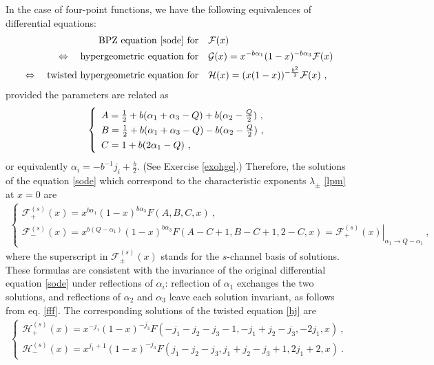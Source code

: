 \documentclass[12pt,a4paper,notitlepage]{report}
\numberwithin{equation}{section}
\theoremstyle{break}
\begin{document}
In the case of four-point functions, we have the following equivalences of differential equations:
\begin{align}
  \text{BPZ equation \eqref{sode} for}\quad  & \mathcal{F}(x)
\\ 
\Leftrightarrow\quad  \text{hypergeometric\ equation\ for\quad }&  \mathcal{G}(x)= x^{-b\alpha_1}(1-x)^{-b\alpha_3}\mathcal{F}(x) 
\\
\Leftrightarrow\quad  \text{twisted\ hypergeometric\ equation\ for\quad }& \mathcal{H}(x)=(x(1-x))^{-\frac{b^2}{2}}\mathcal{F}(x) \ ,
\label{fgs}
\end{align}
provided the parameters are related as
\begin{align}
\renewcommand{\arraystretch}{1.3}
\left\{\begin{array}{l}   A = \frac12 + b(\alpha_1+\alpha_3-Q) + b(\alpha_2-\tfrac{Q}{2}) \ , \\
      B = \frac12 + b(\alpha_1+\alpha_3-Q) - b(\alpha_2-\tfrac{Q}{2}) \ , \\
      C = 1 + b(2\alpha_1-Q) \ ,
\end{array}\right. 
\label{abc}
\end{align}
or equivalently $\alpha_i = -b^{-1}j_i +\frac{b}{2}$.
(See Exercise \ref{exohge}.) 
Therefore, the solutions of the equation \eqref{sode} which correspond to the characteristic exponents $\lambda_\pm$ \eqref{lpm} at $x=0$ are 
\begin{align}
\left\{\begin{array}{l}  \mathcal{F}^{(s)}_+(x) = x^{b\alpha_1} (1-x)^{b\alpha_3} F(A,B,C,x)\ ,
\\ \mathcal{F}^{(s)}_-(x)  =x^{b(Q-\alpha_1)} (1-x)^{b\alpha_3} F(A-C+1,B-C+1,2-C,x)= \left. \mathcal{F}^{(s)}_+(x) \right|_{\alpha_1\rightarrow Q-\alpha_1} \ ,
\end{array}\right. 
\label{gpm}
\end{align}
where the superscript in $\mathcal{F}^{(s)}_\pm(x)$ stands for the $s$-channel basis of solutions.
These formulas are consistent with the invariance of the original differential equation \eqref{sode} under reflections of $\alpha_i$: reflection of $\alpha_1$ exchanges the two solutions, and reflections of $\alpha_2$ and $\alpha_3$ leave each solution invariant, as follows from eq. \eqref{fff}.
The corresponding solutions of the twisted equation \eqref{hj} are 
\begin{align}
\left\{\begin{array}{l}  \mathcal{H}^{(s)}_+(x)  = x^{-j_1}(1-x)^{-j_3} F(-j_1-j_2-j_3-1,-j_1+j_2-j_3,-2j_1,x)\ ,
\\
 \mathcal{H}^{(s)}_-(x)  = x^{j_1+1}(1-x)^{-j_3} F(j_1-j_2-j_3,j_1+j_2-j_3+1,2j_1+2,x)\ .
\end{array}\right. 
\label{fpm}
\end{align}
\end{document}
